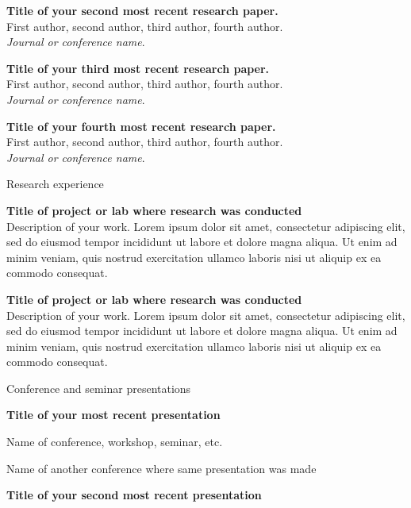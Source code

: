 \documentclass[letterpaper, 10pt]{article}
\newcommand{\heading}[1]{{\Large\color{Mahogany} #1}\medskip}
\begin{document}
\textbf{Title of your second most recent research paper.} \\ 
First author, second author, third author, fourth author. \\
\textit{Journal or conference name}. \medskip

\textbf{Title of your third most recent research paper.} \\ 
First author, second author, third author, fourth author. \\
\textit{Journal or conference name}. \medskip

\textbf{Title of your fourth most recent research paper.} \\ 
First author, second author, third author, fourth author. \\
\textit{Journal or conference name}.

\bigskip\bigskip


\heading{Research experience}

\textbf{Title of project or lab where research was conducted} \\
Description of your work. Lorem ipsum dolor sit amet, consectetur adipiscing elit, sed do eiusmod tempor incididunt ut labore et dolore magna aliqua. Ut enim ad minim veniam, quis nostrud exercitation ullamco laboris nisi ut aliquip ex ea commodo consequat. \medskip

\textbf{Title of project or lab where research was conducted} \\
Description of your work. Lorem ipsum dolor sit amet, consectetur adipiscing elit, sed do eiusmod tempor incididunt ut labore et dolore magna aliqua. Ut enim ad minim veniam, quis nostrud exercitation ullamco laboris nisi ut aliquip ex ea commodo consequat. \medskip

\bigskip\bigskip


\heading{Conference and seminar presentations}

\textbf{Title of your most recent presentation}

Name of conference, workshop, seminar, etc.

Name of another conference where same presentation was made\medskip

\textbf{Title of your second most recent presentation}
\end{document}
